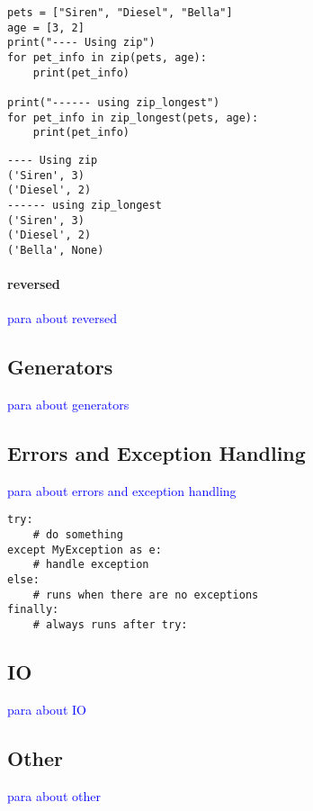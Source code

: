 \begin{lstlisting}[style=pyInStyle]
pets = ["Siren", "Diesel", "Bella"]
age = [3, 2]
print("---- Using zip")
for pet_info in zip(pets, age):
    print(pet_info)

print("------ using zip_longest")
for pet_info in zip_longest(pets, age):
    print(pet_info)
\end{lstlisting}
\begin{lstlisting}[style=pyOutStyle]
---- Using zip
('Siren', 3)
('Diesel', 2)
------ using zip_longest
('Siren', 3)
('Diesel', 2)
('Bella', None)
\end{lstlisting}

\paragraph{reversed}

\textcolor{blue}{para about reversed}

\subsection{Generators}

\textcolor{blue}{para about generators}

\subsection{Errors and Exception Handling}

\textcolor{blue}{para about errors and exception handling}

\begin{lstlisting}[style=pyInStyle]
try:
    # do something
except MyException as e:
    # handle exception
else:
    # runs when there are no exceptions
finally:
    # always runs after try:
\end{lstlisting}

\subsection{IO}

\textcolor{blue}{para about IO}

\subsection{Other}

\textcolor{blue}{para about other}


